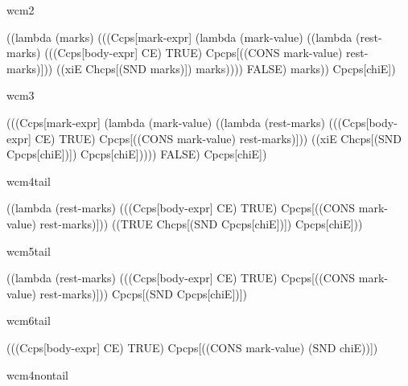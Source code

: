 \noindent
wcm2

\begin{schemeblock}
\begin{schemedisplay}
((lambda (marks)
   (((Ccps[mark-expr]
          (lambda (mark-value) 
            ((lambda (rest-marks) 
               (((Ccps[body-expr] CE) TRUE) Cpcps[((CONS mark-value) rest-marks)]))
             ((xiE Chcps[(SND marks)]) marks))))
     FALSE) marks))
 Cpcps[chiE])
\end{schemedisplay}
\end{schemeblock}

\noindent
wcm3

\begin{schemeblock}
\begin{schemedisplay}
(((Ccps[mark-expr]
       (lambda (mark-value) 
         ((lambda (rest-marks) 
            (((Ccps[body-expr] CE) TRUE) Cpcps[((CONS mark-value) rest-marks)]))
          ((xiE Chcps[(SND Cpcps[chiE])]) Cpcps[chiE]))))
  FALSE) Cpcps[chiE])
\end{schemedisplay}
\end{schemeblock}

\noindent
wcm4tail

\begin{schemeblock}
\begin{schemedisplay}
((lambda (rest-marks) 
   (((Ccps[body-expr] CE) TRUE) Cpcps[((CONS mark-value) rest-marks)]))
 ((TRUE Chcps[(SND Cpcps[chiE])]) Cpcps[chiE]))
\end{schemedisplay}
\end{schemeblock}

\noindent
wcm5tail

\begin{schemeblock}
\begin{schemedisplay}
((lambda (rest-marks) 
   (((Ccps[body-expr] CE) TRUE) Cpcps[((CONS mark-value) rest-marks)]))
 Cpcps[(SND Cpcps[chiE])])
\end{schemedisplay}
\end{schemeblock}

\noindent
wcm6tail

\begin{schemeblock}
\begin{schemedisplay}
(((Ccps[body-expr] CE) TRUE) Cpcps[((CONS mark-value) (SND chiE))])
\end{schemedisplay}
\end{schemeblock}

\noindent
wcm4nontail

